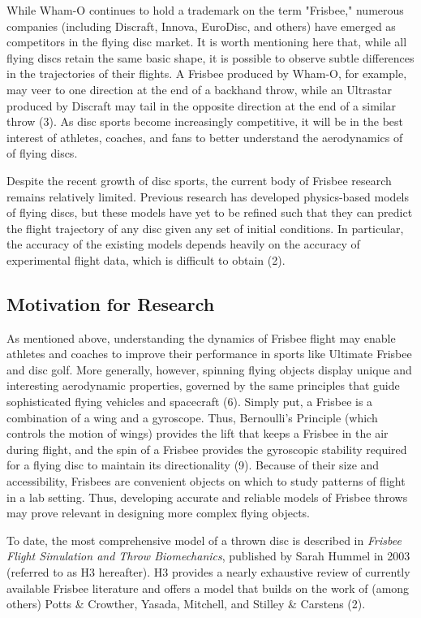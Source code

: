 \documentclass[a4paper,12pt, oneside]{article}
\begin{document}
While Wham-O continues to hold a trademark on the term "Frisbee," numerous companies (including Discraft, Innova, EuroDisc, and others) have emerged as competitors in the flying disc market. It is worth mentioning here that, while all flying discs retain the same basic shape, it is possible to observe subtle differences in the trajectories of their flights.  A Frisbee produced by Wham-O, for example, may veer to one direction at the end of a backhand throw, while an Ultrastar produced by Discraft may tail in the opposite direction at the end of a similar throw (3).  As disc sports become increasingly competitive, it will be in the best interest of athletes, coaches, and fans to better understand the aerodynamics of of flying discs.

Despite the recent growth of disc sports, the current body of Frisbee research remains relatively limited. Previous research has developed physics-based models of flying discs, but these models have yet to be refined such that they can predict the flight trajectory of any disc given any set of initial conditions. In particular, the accuracy of the existing models depends heavily on the accuracy of experimental flight data, which is difficult to obtain (2).

\subsection{Motivation for Research}

As mentioned above, understanding the dynamics of Frisbee flight may enable athletes and coaches to improve their performance in sports like Ultimate Frisbee and disc golf.  More generally, however, spinning flying objects display unique and interesting aerodynamic properties, governed by the same principles that guide sophisticated flying vehicles and spacecraft (6). Simply put, a Frisbee is a combination of a wing and a gyroscope. Thus, Bernoulli's Principle (which controls the motion of wings) provides the lift that keeps a Frisbee in the air during flight, and the spin of a Frisbee provides the gyroscopic stability required for a flying disc to maintain its directionality (9). Because of their size and accessibility, Frisbees are convenient objects on which to study patterns of flight in a lab setting. Thus, developing accurate and reliable models of Frisbee throws may prove relevant in designing more complex flying objects. 
 
To date, the most comprehensive model of a thrown disc is described in \textit{Frisbee Flight Simulation and Throw Biomechanics}, published by Sarah Hummel in 2003 (referred to as H3 hereafter). H3 provides a nearly exhaustive review of currently available Frisbee literature and offers a model that builds on the work of (among others) Potts \& Crowther, Yasada, Mitchell, and Stilley \& Carstens (2). 
\end{document}
